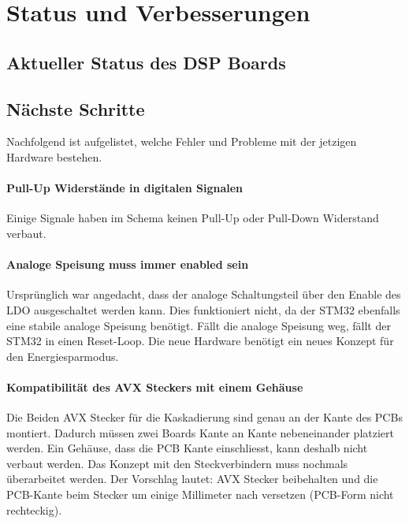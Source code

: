 \section{Status und Verbesserungen}
\label{sec:Status}

\subsection{Aktueller Status des DSP Boards}


\subsection{Nächste Schritte}

Nachfolgend ist aufgelistet, welche Fehler und Probleme mit der jetzigen Hardware bestehen.

\paragraph{Pull-Up Widerstände in digitalen Signalen}

Einige Signale haben im Schema keinen Pull-Up oder Pull-Down Widerstand verbaut.


\paragraph{Analoge Speisung muss immer enabled sein}

Ursprünglich war angedacht, dass der analoge Schaltungsteil über den Enable des LDO ausgeschaltet werden kann. Dies funktioniert nicht, da der STM32 ebenfalls eine stabile analoge Speisung benötigt. Fällt die analoge Speisung weg, fällt der STM32 in einen Reset-Loop.
Die neue Hardware benötigt ein neues Konzept für den Energiesparmodus.

\paragraph{Kompatibilität des AVX Steckers mit einem Gehäuse}

Die Beiden AVX Stecker für die Kaskadierung sind genau an der Kante des PCBs montiert. Dadurch müssen zwei Boards Kante an Kante nebeneinander platziert werden.
Ein Gehäuse, dass die PCB Kante einschliesst, kann deshalb nicht verbaut werden.
Das Konzept mit den Steckverbindern muss nochmals überarbeitet werden.
Der Vorschlag lautet: AVX Stecker beibehalten und die PCB-Kante beim Stecker um einige Millimeter nach versetzen (PCB-Form nicht rechteckig).

